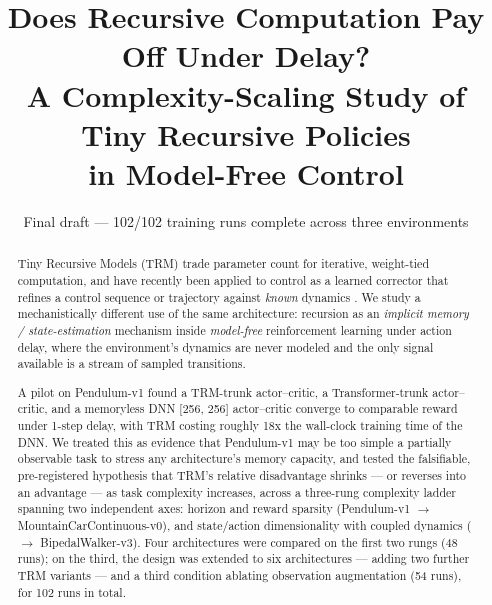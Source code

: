 \documentclass[11pt]{article}
\title{Does Recursive Computation Pay Off Under Delay?\\
A Complexity-Scaling Study of Tiny Recursive Policies\\
in Model-Free Control}
\author{}
\date{Final draft --- 102/102 training runs complete across three environments}
\begin{document}
\maketitle

\begin{abstract}
Tiny Recursive Models (TRM) trade parameter count for iterative, weight-tied computation, and have recently been applied to control as a learned corrector that refines a control sequence or trajectory against \emph{known} dynamics \citep{jainlinares2025trc, wijayatunga2026trmpl}. We study a mechanistically different use of the same architecture: recursion as an \emph{implicit memory / state-estimation} mechanism inside \emph{model-free} reinforcement learning under action delay, where the environment's dynamics are never modeled and the only signal available is a stream of sampled transitions.

A pilot on Pendulum-v1 found a TRM-trunk actor--critic, a Transformer-trunk actor--critic, and a memoryless DNN [256, 256] actor--critic converge to comparable reward under 1-step delay, with TRM costing roughly 18x the wall-clock training time of the DNN. We treated this as evidence that Pendulum-v1 may be too simple a partially observable task to stress any architecture's memory capacity, and tested the falsifiable, pre-registered hypothesis that TRM's relative disadvantage shrinks --- or reverses into an advantage --- as task complexity increases, across a three-rung complexity ladder spanning two independent axes: horizon and reward sparsity (Pendulum-v1 $\to$ MountainCarContinuous-v0), and state/action dimensionality with coupled dynamics ($\to$ BipedalWalker-v3). Four architectures were compared on the first two rungs (48 runs); on the third, the design was extended to six architectures --- adding two further TRM variants --- and a third condition ablating observation augmentation (54 runs), for 102 runs in total.


\end{abstract}
\end{document}
